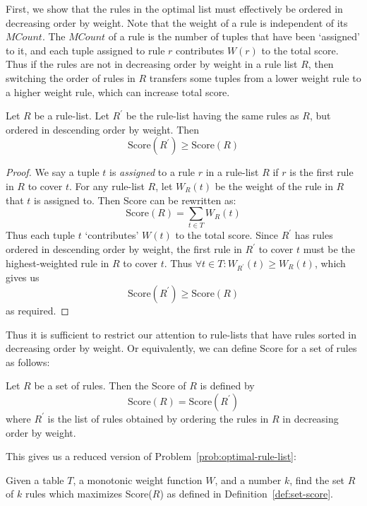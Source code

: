 First, we show that the rules in the optimal list must effectively be ordered in decreasing order by weight. Note that the weight of a rule is independent of its $MCount$. The $MCount$ of a rule is the number of tuples that have been `assigned' to it, and each tuple assigned to rule $r$ contributes $W(r)$ to the total score. Thus if the rules are not in decreasing order by weight in a rule list $R$, then switching the order of rules in $R$ transfers some tuples from a lower weight rule to a higher weight rule, which can increase total score.

\begin{lemma}\label{lemma:rule-ordering}
Let $R$ be a rule-list. Let $R^{\prime}$ be the rule-list having the same rules as $R$, but ordered in descending order by weight. Then
$$\text{Score}(R^{\prime}) \geq \text{Score}(R)$$
\end{lemma}
\begin{proof}
We say a tuple $t$ is {\em assigned} to a rule $r$ in a rule-list $R$ if $r$ is the first rule in $R$ to cover $t$. For any rule-list $R$, let $W_{R}(t)$ be the weight of the rule in $R$ that $t$ is assigned to. Then Score can be rewritten as:
$$\text{Score}(R) = \sum_{t\in T}W_{R}(t)$$
Thus each tuple $t$ `contributes' $W(t)$ to the total score. Since $R^{\prime}$ has rules ordered in descending order by weight, the first rule in $R^{\prime}$ to cover $t$ must be the highest-weighted rule in $R$ to cover $t$. Thus $\forall t \in T : W_{R^{\prime}}(t) \geq W_{R}(t) $, which gives us
$$\text{Score}(R^{\prime}) \geq \text{Score}(R)$$
as required.
\end{proof}

\noindent Thus it is sufficient to restrict our attention to rule-lists that have rules sorted in decreasing order by weight. Or equivalently, we can define Score for a set of rules as follows:

\begin{definition}\label{def:set-score}
Let $R$ be a set of rules. Then the Score of $R$ is defined by
$$\text{Score}(R) = \text{Score}(R^{\prime})$$
where $R^{\prime}$ is the list of rules obtained by ordering the rules in $R$ in decreasing order by weight.
\end{definition}

This gives us a reduced version of Problem~\ref{prob:optimal-rule-list}: 
\begin{problem}\label{prob:optimal-rule-set}
Given a table $T$, a monotonic weight function $W$, and a number $k$, find the set $R$ of $k$ rules which maximizes Score($R$) as defined in Definition~\ref{def:set-score}.
\end{problem}

